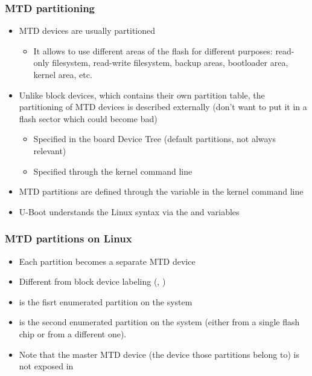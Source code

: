 \begin{frame}
  \frametitle{MTD partitioning}
  \begin{itemize}
  \item MTD devices are usually partitioned
    \begin{itemize}
    \item It allows to use different areas of the flash for different
      purposes: read-only filesystem, read-write filesystem, backup
      areas, bootloader area, kernel area, etc.
    \end{itemize}
  \item Unlike block devices, which contains their own partition
    table, the partitioning of MTD devices is described externally
    (don't want to put it in a flash sector which could become bad)
    \begin{itemize}
    \item Specified in the board Device Tree (default partitions, not always relevant)
    \item Specified through the kernel command line
    \end{itemize}
  \item MTD partitions are defined through the  variable in
    the kernel command line
  \item U-Boot understands the Linux syntax via the  and
     variables
  \end{itemize}
\end{frame}

\begin{frame}
  \frametitle{MTD partitions on Linux}
  \begin{itemize}
  \item Each partition becomes a separate MTD device
  \item Different from block device labeling (,
    )
  \item {} is the fisrt enumerated partition on the system
  \item {} is the second enumerated partition on the system
    (either from a single flash chip or from a different one).
  \item Note that the master MTD device (the device those partitions
    belong to) is not exposed in 
  \end{itemize}
\end{frame}

